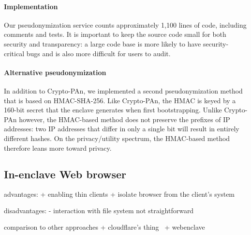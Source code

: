 \paragraph{Implementation}
Our pseudonymization service counts approximately 1,100 lines of code, including
comments and tests.  It is important to keep the source code small for both
security and transparency: a large code base is more likely to have
security-critical bugs and is also more difficult for users to audit.

\paragraph{Alternative pseudonymization}
In addition to Crypto-PAn, we implemented a second pseudonymization method that
is based on HMAC-SHA-256.  Like Crypto-PAn, the HMAC is keyed by a 160-bit
secret that the enclave generates when first bootstrapping.  Unlike Crypto-PAn
however, the HMAC-based method does not preserve the prefixes of IP addresses:
two IP addresses that differ in only a single bit will result in entirely
different hashes.  On the privacy/utility spectrum, the HMAC-based method
therefore leans more toward privacy.
\fi

\subsection{In-enclave Web browser}%
\label{sec:browser}

advantages:
+ enabling thin clients
+ isolate browser from the client's system

disadvantages:
- interaction with file system not straightforward

comparison to other approaches
+ cloudflare's thing~\cite{cf-browser-isolation}
+ webenclave~\cite{Wang2021a}
